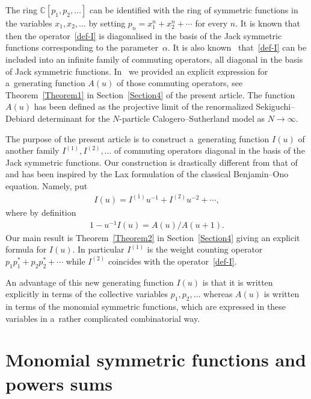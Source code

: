 \documentclass[11pt]{article}
\numberwithin{equation}{section}
\begin{document}
The ring $\mathbb C[p_1,p_2,\ldots]$ can be identif\/ied with the ring of symmetric functions in the
variables $x_1,x_2,\ldots$ by setting $p_n=x_1^{ n}+x_2^{ n}+\cdots$ for
every $n$.
It is known that then the operator~\eqref{def-I} is diagonalised in the basis of the Jack symmetric
functions corresponding to the parameter~$\alpha$.
It is also known~\cite{SV} that~\eqref{def-I} can be included into an inf\/inite family of commuting
operators, all diagonal in the basis of Jack symmetric functions.
In~\cite{NS1} we provided an explicit expression for a~generating function $A(u)$ of those commuting
operators, see Theorem~\ref{Theorem1} in Section~\ref{Section4} of the present article.
The function $A(u)$ has been def\/ined as the projective limit of the renormalized Sekiguchi--Debiard
determinant for the $N$-particle Calogero--Sutherland model as $N\rightarrow\infty$.

The purpose of the present article is to construct a~generating function $I(u)$ of another family
$I^{(1)},I^{(2)},\ldots$ of commuting operators diagonal in the basis of
the Jack symmetric functions.
Our construction is drastically dif\/ferent from that of~\cite{NS1} and has been inspired by the Lax
formulation of the classical Benjamin--Ono equation.
Namely, put
\begin{gather}
\label{iu}
I(u)=I^{(1)}u^{-1}+I^{(2)}u^{-2}+\cdots,
\end{gather}
where by def\/inition
\begin{gather}
\label{hdef}
1-u^{-1}I(u)=A(u)/A(u+1).
\end{gather}
Our main result is Theorem~\ref{Theorem2} in Section~\ref{Section4} giving an explicit formula for $I(u)$.
In particular $I^{(1)}$ is the weight counting operator
$p_1p_1^{\ast}+p_2p_2^{\ast}+\cdots$ while $I^{(2)}$
coincides with the operator~\eqref{def-I}.

An advantage of this new generating function $I(u)$ is that it is written explicitly in terms of the
collective variables $p_1,p_2,\ldots$ whereas $A(u)$ is written in terms of the monomial symmetric
functions, which are expressed in these variables in a~rather complicated combinatorial way.

\setcounter{section}{2}
\setcounter{subsection}{0}
\setcounter{subsubsection}{0}
\setcounter{equation}{6}
\section{Monomial symmetric functions and powers sums}\label{Section3}
\end{document}
